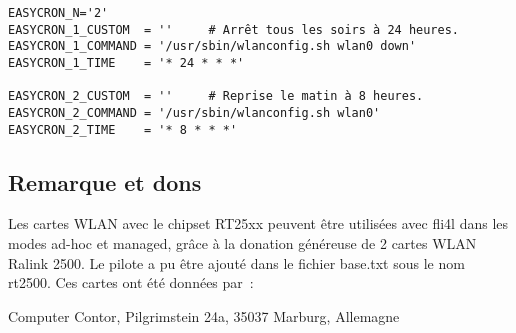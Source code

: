 \begin{example}
\begin{verbatim}
EASYCRON_N='2'
EASYCRON_1_CUSTOM  = ''     # Arrêt tous les soirs à 24 heures.
EASYCRON_1_COMMAND = '/usr/sbin/wlanconfig.sh wlan0 down'
EASYCRON_1_TIME    = '* 24 * * *'

EASYCRON_2_CUSTOM  = ''     # Reprise le matin à 8 heures.
EASYCRON_2_COMMAND = '/usr/sbin/wlanconfig.sh wlan0'
EASYCRON_2_TIME    = '* 8 * * *'
\end{verbatim}
\end{example}


\subsection{Remarque et dons}

      Les cartes WLAN avec le chipset RT25xx peuvent être utilisées avec fli4l
      dans les modes ad-hoc et managed, grâce à la donation généreuse de 2
      cartes WLAN Ralink 2500. Le pilote a pu être ajouté dans le fichier
      base.txt sous le nom rt2500. Ces cartes ont été données par~:

      Computer Contor, Pilgrimstein 24a, 35037 Marburg, Allemagne
